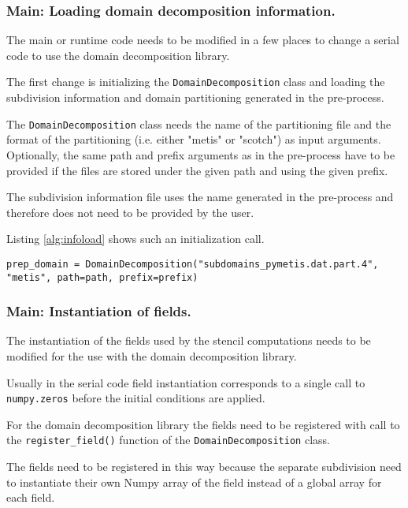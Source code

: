 \subsubsection{Main: Loading domain decomposition information.}
The main or runtime code needs to be modified in a few places to change a serial code to use the domain decomposition library.

The first change is initializing the \texttt{DomainDecomposition} class and loading the subdivision information and domain partitioning generated in the pre-process.

The \texttt{DomainDecomposition} class needs the name of the partitioning file and the format of the partitioning (i.e. either "metis" or "scotch") as input arguments.
Optionally, the same path and prefix arguments as in the pre-process have to be provided if the files are stored under the given path and using the given prefix.

The subdivision information file uses the name generated in the pre-process and therefore does not need to be provided by the user.

Listing \ref{alg:infoload} shows such an initialization call.

\begin{lstlisting}[caption={Example code for the loading of the domain decomposition information.},captionpos=b, label={alg:infoload}, float, floatplacement=H]
prep_domain = DomainDecomposition("subdomains_pymetis.dat.part.4", "metis", path=path, prefix=prefix)
\end{lstlisting}

\subsubsection{Main: Instantiation of fields.}
The instantiation of the fields used by the stencil computations needs to be modified for the use with the domain decomposition library.

Usually in the serial code field instantiation corresponds to a single call to \texttt{numpy.zeros} before the initial conditions are applied.

For the domain decomposition library the fields need to be registered with call to the \texttt{register\_field()} function of the \texttt{DomainDecomposition} class.

The fields need to be registered in this way because the separate subdivision need to instantiate their own Numpy array of the field instead of a global array for each field.

